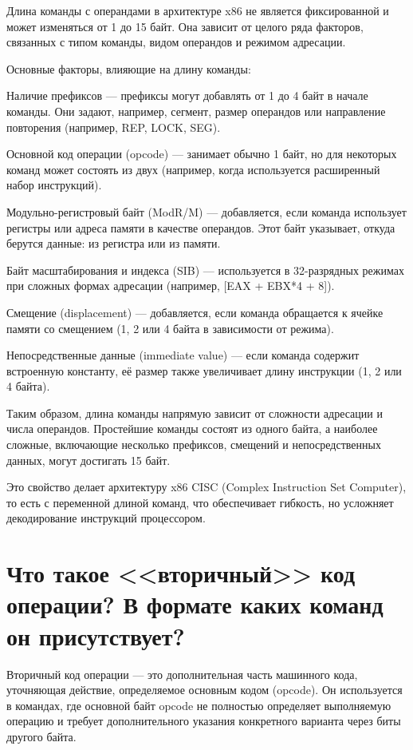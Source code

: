Длина команды с операндами в архитектуре x86 не является фиксированной и может изменяться от 1 до 15 байт. Она зависит от целого ряда факторов, связанных с типом команды, видом операндов и режимом адресации.

Основные факторы, влияющие на длину команды:

Наличие префиксов — префиксы могут добавлять от 1 до 4 байт в начале команды. Они задают, например, сегмент, размер операндов или направление повторения (например, REP, LOCK, SEG).

Основной код операции (opcode) — занимает обычно 1 байт, но для некоторых команд может состоять из двух (например, когда используется расширенный набор инструкций).

Модульно-регистровый байт (ModR/M) — добавляется, если команда использует регистры или адреса памяти в качестве операндов. Этот байт указывает, откуда берутся данные: из регистра или из памяти.

Байт масштабирования и индекса (SIB) — используется в 32-разрядных режимах при сложных формах адресации (например, [EAX + EBX*4 + 8]).

Смещение (displacement) — добавляется, если команда обращается к ячейке памяти со смещением (1, 2 или 4 байта в зависимости от режима).

Непосредственные данные (immediate value) — если команда содержит встроенную константу, её размер также увеличивает длину инструкции (1, 2 или 4 байта).

Таким образом, длина команды напрямую зависит от сложности адресации и числа операндов. Простейшие команды состоят из одного байта, а наиболее сложные, включающие несколько префиксов, смещений и непосредственных данных, могут достигать 15 байт.

Это свойство делает архитектуру x86 CISC (Complex Instruction Set Computer), то есть с переменной длиной команд, что обеспечивает гибкость, но усложняет декодирование инструкций процессором.


\section{Что такое <<вторичный>> код операции? В формате каких команд он присутствует?}

Вторичный код операции — это дополнительная часть машинного кода, уточняющая действие, определяемое основным кодом (opcode). Он используется в командах, где основной байт opcode не полностью определяет выполняемую операцию и требует дополнительного указания конкретного варианта через биты другого байта.

